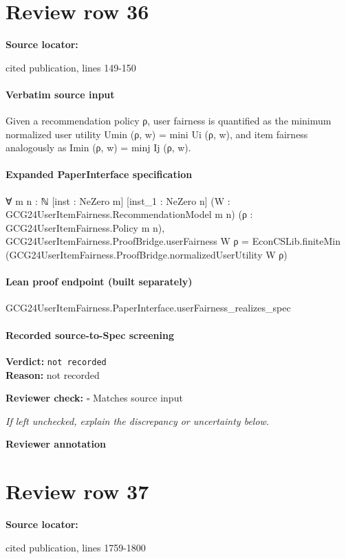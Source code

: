 \documentclass[10pt]{article}
\newcommand{\reviewerbox}{%
  \par\noindent\fbox{\parbox{0.96\linewidth}{\rule{0pt}{0.38in}}}\par
}
\newcommand{\reviewmatch}[1]{%
  \par\noindent\textbf{Reviewer check:} $\square$\; #1\par
  \noindent\emph{If left unchecked, explain the discrepancy or uncertainty below.}\par
}
\begin{document}
\section*{Review row 36}
\textbf{Source locator:} {\footnotesize\raggedright cited publication, lines 149-\allowbreak{}150\par}
\paragraph{Verbatim source input}
\begin{ReviewVerbatim}
Given a recommendation policy ρ, user fairness is quantified as the minimum normalized user utility
Umin (ρ, w) = mini Ui (ρ, w), and item fairness analogously as Imin (ρ, w) = minj Ij (ρ, w).
\end{ReviewVerbatim}


\paragraph{Expanded PaperInterface specification}
\begin{ReviewVerbatim}
∀ {m n : ℕ} [inst : NeZero m] [inst_1 : NeZero n] (W : GCG24UserItemFairness.RecommendationModel m n)
  (ρ : GCG24UserItemFairness.Policy m n),
  GCG24UserItemFairness.ProofBridge.userFairness W ρ =
    EconCSLib.finiteMin (GCG24UserItemFairness.ProofBridge.normalizedUserUtility W ρ)
\end{ReviewVerbatim}

\paragraph{Lean proof endpoint (built separately)}\begin{ReviewVerbatim}
GCG24UserItemFairness.PaperInterface.userFairness_realizes_spec
\end{ReviewVerbatim}

\paragraph{Recorded source-to-Spec screening}
\textbf{Verdict:} \texttt{not recorded}
\\
\textbf{Reason:} not recorded
\reviewmatch{Matches source input}
\noindent\textbf{Reviewer annotation}\par
\reviewerbox
\clearpage
\hypertarget{source-claim-dd1e59dd74c380a1}{}
\section*{Review row 37}
\textbf{Source locator:} {\footnotesize\raggedright cited publication, lines 1759-\allowbreak{}1800\par}
\end{document}
